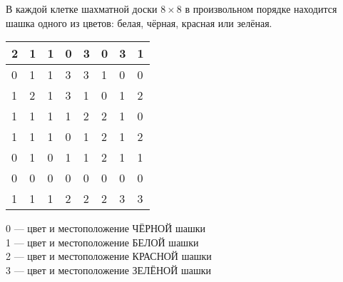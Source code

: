 В каждой клетке шахматной доски $8 \times 8$ в произвольном порядке находится шашка одного из цветов: белая, чёрная, красная или зелёная.

\begin{tabular}{| l | l | l | l | l | l | l | l |}
    \hline
    2 & 1 & 1 & 0 & 3 & 0 & 3 & 1 \\ \hline
    0 & 1 & 1 & 3 & 3 & 1 & 0 & 0 \\ \hline
    1 & 2 & 1 & 3 & 1 & 0 & 1 & 2 \\ \hline
    1 & 1 & 1 & 1 & 2 & 2 & 1 & 0 \\ \hline
    1 & 1 & 1 & 0 & 1 & 2 & 1 & 2 \\ \hline
    0 & 1 & 0 & 1 & 1 & 2 & 1 & 1 \\ \hline
    0 & 0 & 0 & 0 & 0 & 0 & 0 & 0 \\ \hline
    1 & 1 & 1 & 2 & 2 & 2 & 3 & 3 \\ \hline
\end{tabular}

0 --- цвет и местоположение ЧЁРНОЙ шашки \\
1 --- цвет и местоположение БЕЛОЙ шашки \\
2 --- цвет и местоположение КРАСНОЙ шашки \\
3 --- цвет и местоположение ЗЕЛЁНОЙ шашки \\